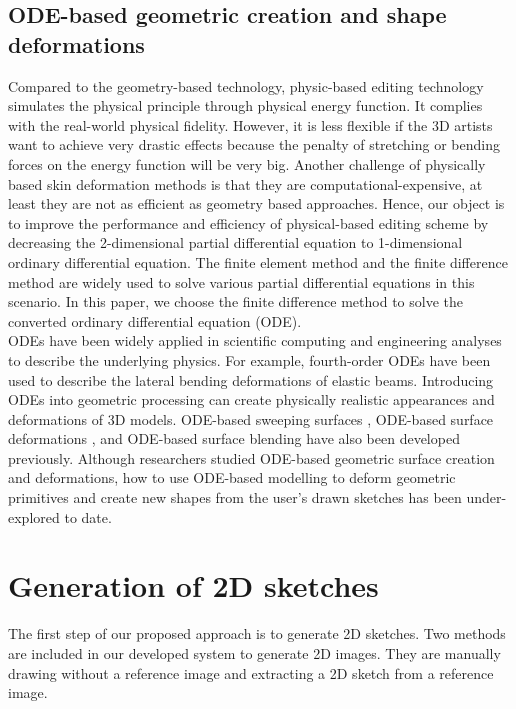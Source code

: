 \documentclass[runningheads]{llncs}
\begin{document}
\subsection{ODE-based geometric creation and shape deformations}
Compared to the geometry-based technology, physic-based editing technology simulates the physical principle through physical energy function. It complies with the real-world physical fidelity. However, it is less flexible if the 3D artists want to achieve very drastic effects because the penalty of stretching or bending forces on the energy function will be very big. Another challenge of physically based skin deformation methods is that they are computational-expensive, at least they are not as efficient as geometry based approaches. Hence, our object is to improve the performance and efficiency of physical-based editing scheme by decreasing the 2-dimensional partial differential equation to 1-dimensional ordinary differential equation. The finite element method and the finite difference method are widely used to solve various partial differential equations in this scenario. In this paper, we choose the finite difference method to solve the converted ordinary differential equation (ODE). \\ 
ODEs have been widely applied in scientific computing and engineering analyses to describe the underlying physics. For example, fourth-order ODEs have been used to describe the lateral bending deformations of elastic beams. Introducing ODEs into geometric processing can create physically realistic appearances and deformations of 3D models. ODE-based sweeping surfaces \cite{you2007boundary}, ODE-based surface deformations \cite{you2010shape,chaudhry2013shape}, and ODE-based surface blending \cite{you2014blending} have also been developed previously. 
Although researchers studied ODE-based geometric surface creation and deformations, how to use ODE-based modelling to deform geometric primitives and create new shapes from the user's drawn sketches has been under-explored to date. \\


\section{Generation of 2D sketches}\label{Generation of 2d sketches}
The first step of our proposed approach is to generate 2D sketches. Two methods are included in our developed system to generate 2D images. They are manually drawing without a reference image and extracting a 2D sketch from a reference image.\\
\end{document}

